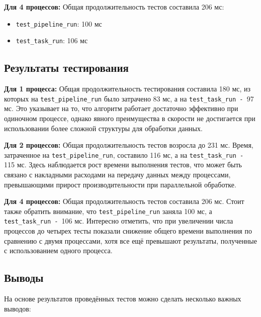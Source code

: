 \documentclass[12pt]{article}
\begin{document}
\textbf{Для 4 процессов:}  
Общая продолжительность тестов составила 206 мс:
\begin{itemize}
    \item \texttt{test\_pipeline\_run}: 100 мс
    \item \texttt{test\_task\_run}: 106 мс
\end{itemize}

\subsection{Результаты тестирования}

\textbf{Для 1 процесса:}  
Общая продолжительность тестирования составила 180 мс, из которых на \texttt{test\_pipeline\_run} было затрачено 83 мс, а на \texttt{test\_task\_run - }97 мс. Это указывает на то, что алгоритм работает достаточно эффективно при одиночном процессе, однако явного преимущества в скорости не достигается при использовании более сложной структуры для обработки данных.

\textbf{Для 2 процессов:}  
Общая продолжительность тестов возросла до 231 мс. Время, затраченное на \texttt{test\_pipeline\_run}, составило 116 мс, а на \texttt{test\_task\_run - }115 мс. Здесь наблюдается рост времени выполнения тестов, что может быть связано с накладными расходами на передачу данных между процессами, превышающими прирост производительности при параллельной обработке.

\textbf{Для 4 процессов:}  
Общая продолжительность тестов составила 206 мс. Стоит также обратить внимание, что \texttt{test\_pipeline\_run} заняла 100 мс, а \texttt{test\_task\_run - }106 мс. Интересно отметить, что при увеличении числа процессов до четырех тесты показали снижение общего времени выполнения по сравнению с двумя процессами, хотя все ещё превышают результаты, полученные с использованием одного процесса.

\subsection{Выводы}

На основе результатов проведённых тестов можно сделать несколько важных выводов:
\end{document}
